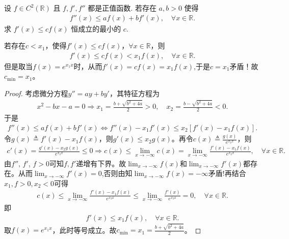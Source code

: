 \documentclass[../../main.tex]{subfiles}
\begin{document}
\begin{example}
设 $f \in C^2(\mathbb{R})$ 且 $f, f', f''$ 都是正值函数. 若存在 $a, b > 0$ 使得
\begin{align*}
f''(x) \leqslant a f(x) + b f'(x), \quad \forall x \in \mathbb{R}.
\end{align*}
求 $f'(x) \leqslant c f(x)$ 恒成立的最小的 $c$.
\end{example}
\begin{remark}
若存在$c < x_1$，使得$f'(x) \leqslant c f(x)$，$\forall x \in \mathbb{R}$，则
\begin{align*}
f'(x) \leqslant c f(x) < x_1 f(x), \quad \forall x \in \mathbb{R}.
\end{align*}
但是取当$f(x) = e^{x_1 x}$时，从而$f'(x) =cf(x)= x_1 f(x)$,于是$c=x_1$矛盾！故$c_{\min} = x_1$。
\end{remark}
\begin{proof}
考虑微分方程$y'' = ay + by'$，其特征方程为
\begin{align*}
x^2 - bx - a = 0 \Rightarrow x_1 = \frac{b + \sqrt{b^2 + 4a}}{2} > 0, \quad x_2 = \frac{b - \sqrt{b^2 + 4a}}{2} < 0.
\end{align*}
于是
\begin{align*}
f''(x) \leqslant a f(x) + b f'(x) \Longleftrightarrow f''(x) - x_1 f'(x) \leqslant x_2 \left[ f'(x) - x_1 f(x) \right].
\end{align*}
令$g(x) \triangleq f'(x) - x_1 f(x)$，则$g'(x) \leqslant x_2 g(x)$。再令$c(x) \triangleq \frac{g(x)}{e^{x_2 x}}$，则
\begin{align*}
c'(x) = \frac{g'(x) - x_2 g(x)}{e^{x_2 x}} \leqslant 0 \Rightarrow c(x) \leqslant \lim_{x \rightarrow -\infty} c(x) = \lim_{x \rightarrow -\infty} \frac{f'(x) - x_1 f(x)}{e^{x_2 x}}, \quad \forall x \in \mathbb{R}.
\end{align*}
由$f''$, $f'$, $f > 0$可知$f, f'$递增有下界。故$\lim_{x \rightarrow -\infty} f(x)$和$\lim_{x \rightarrow -\infty} f'(x)$都存在。从而$\lim_{x \rightarrow -\infty} f'(x)=0$,否则由知$\lim_{x \rightarrow -\infty} f(x)=-\infty$矛盾!再结合$x_1,f>0,x_2<0$可得
\begin{align*}
c(x)\leqslant \lim_{x\rightarrow -\infty} \frac{f' (x)-x_1f(x)}{e^{x_2x}}\leqslant \lim_{x\rightarrow -\infty} \frac{f' (x)}{e^{x_2x}}=0,\quad \forall x\in \mathbb{R} .
\end{align*}
即
\begin{align*}
f'(x) \leqslant x_1 f(x), \quad \forall x \in \mathbb{R}.
\end{align*}
取$f(x) = e^{x_1 x}$，此时等号成立。故$c_{\min} = x_1 = \frac{b + \sqrt{b^2 + 4a}}{2}$。

\end{proof}
\end{document}
